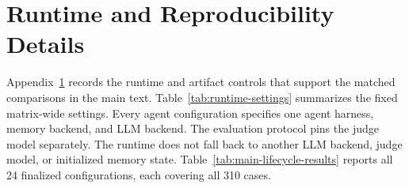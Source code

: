 \documentclass[letterpaper]{article}
\begin{document}
\section{Runtime and Reproducibility Details}
\label{app:runtime-reproducibility}

Appendix~\ref{app:runtime-reproducibility} records the runtime and artifact controls that support the matched comparisons in the main text. Table~\ref{tab:runtime-settings} summarizes the fixed matrix-wide settings. Every agent configuration specifies one agent harness, memory backend, and LLM backend. The evaluation protocol pins the judge model separately. The runtime does not fall back to another LLM backend, judge model, or initialized memory state. Table~\ref{tab:main-lifecycle-results} reports all 24 finalized configurations, each covering all 310 cases.
\end{document}
